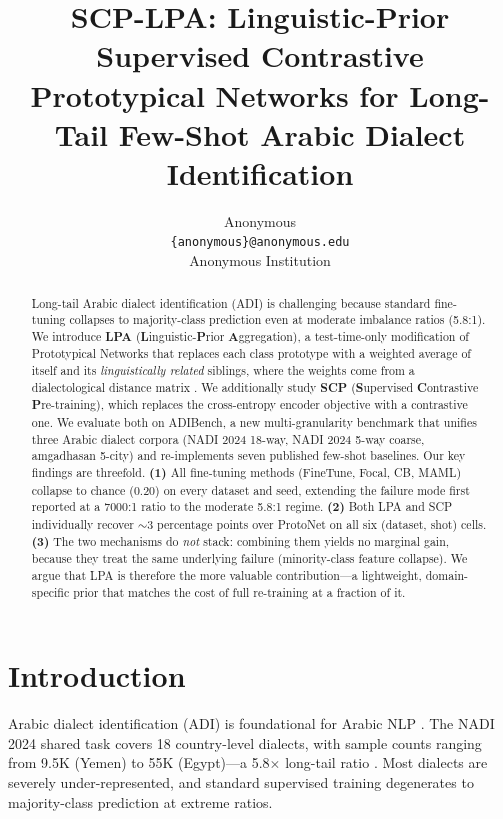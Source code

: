 \documentclass[11pt,a4paper,twocolumn]{article}
\title{SCP-LPA: Linguistic-Prior Supervised Contrastive Prototypical
Networks for Long-Tail Few-Shot Arabic Dialect Identification}
\author{Anonymous \\
  \texttt{\{anonymous\}@anonymous.edu} \\
  Anonymous Institution}
\date{}
\newcommand{\bench}{ADIBench}
\begin{document}
\maketitle

\begin{abstract}
Long-tail Arabic dialect identification (ADI) is challenging
because standard fine-tuning collapses to majority-class
prediction even at moderate imbalance ratios (5.8:1). We
introduce \textbf{LPA} (\textbf{L}inguistic-\textbf{P}rior
\textbf{A}ggregation), a test-time-only modification of
Prototypical Networks that replaces each class prototype with
a weighted average of itself and its \emph{linguistically
related} siblings, where the weights come from a
dialectological distance matrix \citep{Versteegh2006,
Habash2010}. We additionally study \textbf{SCP} (\textbf{S}upervised
\textbf{C}ontrastive \textbf{P}re-training), which replaces the
cross-entropy encoder objective with a contrastive one. We
evaluate both on \bench{}, a new multi-granularity benchmark
that unifies three Arabic dialect corpora (NADI 2024 18-way,
NADI 2024 5-way coarse, amgadhasan 5-city) and re-implements
seven published few-shot baselines. Our key findings are
threefold. \textbf{(1)} All fine-tuning methods (FineTune, Focal,
CB, MAML) collapse to chance (0.20) on every dataset and seed,
extending the failure mode first reported at a 7000:1 ratio
\citeyearpar{DACD2024} to the moderate 5.8:1 regime. \textbf{(2)}
Both LPA and SCP individually recover $\sim$3 percentage points
over ProtoNet on all six (dataset, shot) cells. \textbf{(3)}
The two mechanisms do \emph{not} stack: combining them yields
no marginal gain, because they treat the same underlying
failure (minority-class feature collapse). We argue that LPA is
therefore the more valuable contribution---a lightweight,
domain-specific prior that matches the cost of full
re-training at a fraction of it.
\end{abstract}

\section{Introduction}
Arabic dialect identification (ADI) is foundational for Arabic
NLP \citep{Al-Badrashiny2024,Bouamor2019}. The NADI 2024 shared
task covers 18 country-level dialects, with sample counts
ranging from 9.5K (Yemen) to 55K (Egypt)---a 5.8$\times$
long-tail ratio \citep{Al-Badrashiny2024}. Most dialects are
severely under-represented, and standard supervised training
degenerates to majority-class prediction at extreme ratios.
\end{document}
